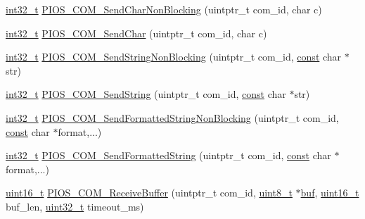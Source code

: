 \begin{DoxyCompactItemize}
\item 
\hyperlink{group___n_a_m_e_gafd12020da5a235dfcf0c3c748fb5baed}{int32\-\_\-t} \hyperlink{group___p_i_o_s___c_o_m_gaf31c3839043db5312b9b9429102964bd}{P\-I\-O\-S\-\_\-\-C\-O\-M\-\_\-\-Send\-Char\-Non\-Blocking} (uintptr\-\_\-t com\-\_\-id, char c)
\item 
\hyperlink{group___n_a_m_e_gafd12020da5a235dfcf0c3c748fb5baed}{int32\-\_\-t} \hyperlink{group___p_i_o_s___c_o_m_ga7b6113a05ea60bcd661bbc5e10a5fe0e}{P\-I\-O\-S\-\_\-\-C\-O\-M\-\_\-\-Send\-Char} (uintptr\-\_\-t com\-\_\-id, char c)
\item 
\hyperlink{group___n_a_m_e_gafd12020da5a235dfcf0c3c748fb5baed}{int32\-\_\-t} \hyperlink{group___p_i_o_s___c_o_m_gaff37e41578d22e06d0f29394340e1762}{P\-I\-O\-S\-\_\-\-C\-O\-M\-\_\-\-Send\-String\-Non\-Blocking} (uintptr\-\_\-t com\-\_\-id, \hyperlink{group___n_a_m_e_ga7ae6d0e43244213b34de2c2b9aa30da6}{const} char $\ast$str)
\item 
\hyperlink{group___n_a_m_e_gafd12020da5a235dfcf0c3c748fb5baed}{int32\-\_\-t} \hyperlink{group___p_i_o_s___c_o_m_gae03e4cae94285f9551800750e0974a84}{P\-I\-O\-S\-\_\-\-C\-O\-M\-\_\-\-Send\-String} (uintptr\-\_\-t com\-\_\-id, \hyperlink{group___n_a_m_e_ga7ae6d0e43244213b34de2c2b9aa30da6}{const} char $\ast$str)
\item 
\hyperlink{group___n_a_m_e_gafd12020da5a235dfcf0c3c748fb5baed}{int32\-\_\-t} \hyperlink{group___p_i_o_s___c_o_m_gaf4608e2b544b62a5130238c2534e19f8}{P\-I\-O\-S\-\_\-\-C\-O\-M\-\_\-\-Send\-Formatted\-String\-Non\-Blocking} (uintptr\-\_\-t com\-\_\-id, \hyperlink{group___n_a_m_e_ga7ae6d0e43244213b34de2c2b9aa30da6}{const} char $\ast$format,...)
\item 
\hyperlink{group___n_a_m_e_gafd12020da5a235dfcf0c3c748fb5baed}{int32\-\_\-t} \hyperlink{group___p_i_o_s___c_o_m_ga1e351c526477c605ee404318ba3c0b79}{P\-I\-O\-S\-\_\-\-C\-O\-M\-\_\-\-Send\-Formatted\-String} (uintptr\-\_\-t com\-\_\-id, \hyperlink{group___n_a_m_e_ga7ae6d0e43244213b34de2c2b9aa30da6}{const} char $\ast$format,...)
\item 
\hyperlink{stdint_8h_a273cf69d639a59973b6019625df33e30}{uint16\-\_\-t} \hyperlink{group___p_i_o_s___c_o_m_ga5e15e044cb0abca89b5655a359d1ef03}{P\-I\-O\-S\-\_\-\-C\-O\-M\-\_\-\-Receive\-Buffer} (uintptr\-\_\-t com\-\_\-id, \hyperlink{stdint_8h_aba7bc1797add20fe3efdf37ced1182c5}{uint8\-\_\-t} $\ast$\hyperlink{mavlink__helpers_8h_af5c51bef7cca88bcb22f0517fdb06153}{buf}, \hyperlink{stdint_8h_a273cf69d639a59973b6019625df33e30}{uint16\-\_\-t} buf\-\_\-len, \hyperlink{stdint_8h_a435d1572bf3f880d55459d9805097f62}{uint32\-\_\-t} timeout\-\_\-ms)

\end{DoxyCompactItemize}
